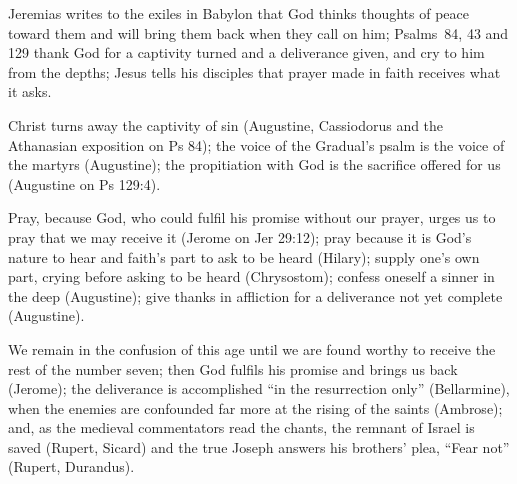 \begin{fourSenses}
\item[Literal.] Jeremias writes to the exiles in Babylon that God thinks
thoughts of peace toward them and will bring them back when they call on him;
Psalms~84, 43 and 129 thank God for a captivity turned and a deliverance
given, and cry to him from the depths; Jesus tells his disciples that prayer
made in faith receives what it asks.
\item[Allegorical.] Christ turns away the captivity of sin (Augustine,
Cassiodorus and the Athanasian exposition on Ps 84); the voice of the Gradual's
psalm is the voice of the martyrs (Augustine); the propitiation with God is
the sacrifice offered for us (Augustine on Ps 129:4).
\item[Moral.] Pray, because God, who could fulfil his promise without our
prayer, urges us to pray that we may receive it (Jerome on Jer 29:12); pray
because it is God's nature to hear and faith's part to ask to be heard
(Hilary); supply one's own part, crying before asking to be heard
(Chrysostom); confess oneself a sinner in the deep (Augustine); give thanks
in affliction for a deliverance not yet complete (Augustine).
\item[Anagogical.] We remain in the confusion of this age until we are found
worthy to receive the rest of the number seven; then God fulfils his promise
and brings us back  (Jerome); the
deliverance is accomplished ``in the resurrection only'' (Bellarmine), when
the enemies are confounded far more at the rising of the saints (Ambrose);
and, as the medieval commentators read the chants, the remnant of Israel is
saved (Rupert, Sicard) and the true Joseph answers his brothers' plea,
``Fear not'' (Rupert, Durandus).
\end{fourSenses}
